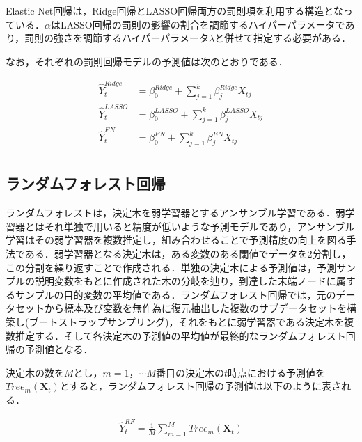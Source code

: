 \documentclass[a4paper，12pt]{jsarticle}
\begin{document}
Elastic Net回帰は，Ridge回帰とLASSO回帰両方の罰則項を利用する構造となっている．$\alpha$はLASSO回帰の罰則の影響の割合を調節するハイパーパラメータであり，罰則の強さを調節するハイパーパラメータ$\lambda$と併せて指定する必要がある．

なお，それぞれの罰則回帰モデルの予測値は次のとおりである．

\begin{equation}
  \begin{split}
    \hat{Y}_t^{Ridge} &= \beta_0^{Ridge} + \sum_{j=1}^{k} \beta_{j}^{Ridge} X_{tj} \\
    \hat{Y}_t^{LASSO} &= \beta_0^{LASSO} + \sum_{j=1}^{k} \beta_{j}^{LASSO} X_{tj} \\
    \hat{Y}_t^{EN} &= \beta_0^{EN} + \sum_{j=1}^{k} \beta_{j}^{EN} X_{tj} \\
  \end{split}
\end{equation}

\subsection{ランダムフォレスト回帰}

ランダムフォレスト\citep{breiman2001random}は，決定木を弱学習器とするアンサンブル学習である．弱学習器とはそれ単独で用いると精度が低いような予測モデルであり，アンサンブル学習はその弱学習器を複数推定し，組み合わせることで予測精度の向上を図る手法である．弱学習器となる決定木は，ある変数のある閾値でデータを2分割し，この分割を繰り返すことで作成される．単独の決定木による予測値は，予測サンプルの説明変数をもとに作成された木の分岐を辿り，到達した末端ノードに属するサンプルの目的変数の平均値である．ランダムフォレスト回帰では，元のデータセットから標本及び変数を無作為に復元抽出した複数のサブデータセットを構築し(ブートストラップサンプリング)，それをもとに弱学習器である決定木を複数推定する．そして各決定木の予測値の平均値が最終的なランダムフォレスト回帰の予測値となる．


決定木の数を$M$とし，$m=1，\cdots M$番目の決定木の$t$時点における予測値を$\textit{Tree}_m(\bm{X}_t)$とすると，ランダムフォレスト回帰の予測値は以下のように表される．

\begin{equation}
  \begin{split}
    \hat{Y}_t^{RF} = \frac{1}{M} \sum_{m=1}^{M} \textit{Tree}_m(\bm{X}_t)
  \end{split}
\end{equation}
\end{document}
